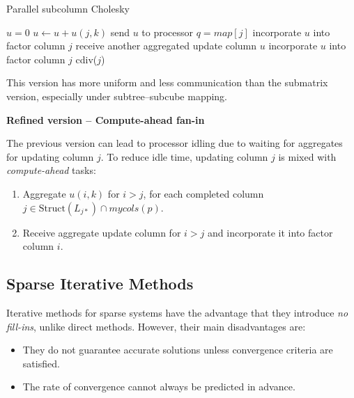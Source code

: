 \documentclass[12pt]{book}
\begin{document}
\begin{algorithm}[H]
\caption{Parallel subcolumn Cholesky}
\begin{algorithmic}[1]
        \State $u = 0$
            \State $u \gets u + u(j,k)$
        \EndFor
            \State send $u$ to processor $q = map[j]$
        \Else
            \State incorporate $u$ into factor column $j$
                \State receive another aggregated update column $u$
                \State incorporate $u$ into factor column $j$
            \EndWhile
            \State cdiv($j$)
        \EndIf
    \EndIf
\EndFor
\end{algorithmic}
\end{algorithm}

This version has more uniform and less communication than the submatrix version, especially under subtree–subcube mapping.


\noindent \textbf{Refined version – Compute-ahead fan-in}  

The previous version can lead to processor idling due to waiting for aggregates for updating column $j$. To reduce idle time, updating column $j$ is mixed with \emph{compute-ahead} tasks:
\begin{enumerate}
    \item Aggregate $u(i,k)$ for $i > j$, for each completed column $j \in \text{Struct}(L_{j*}) \cap mycols(p)$.
    \item Receive aggregate update column for $i > j$ and incorporate it into factor column $i$.
\end{enumerate}



\subsection*{Sparse Iterative Methods}

Iterative methods for sparse systems have the advantage that they introduce \emph{no fill-ins}, unlike direct methods. However, their main disadvantages are:
\begin{itemize}
    \item They do not guarantee accurate solutions unless convergence criteria are satisfied.
    \item The rate of convergence cannot always be predicted in advance.
\end{itemize}
\end{document}
